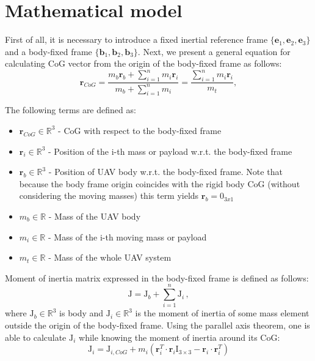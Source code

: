 \section{Mathematical model}

First of all, it is necessary to introduce a fixed inertial reference frame $\{  \textbf{e}_1,  \textbf{e}_2,  \textbf{e}_3  \}$ and a body-fixed frame $ \{  \textbf{b}_1,  \textbf{b}_2,  \textbf{b}_3 \}$. Next, we present
a general equation for calculating CoG vector from the origin of the body-fixed frame as follows: 
\begin{equation}
	\textbf{r}_{CoG} = \frac{m_{b}\textbf{r}_{b} + \sum_{i=1}^n m_{i} \textbf{r}_{i}}{m_{b} + \sum_{i=1}^n m_{i}} = \frac{\sum_{i=1}^n m_{i}\textbf{r}_{i}}{m_t},
	\label{equ:cog}
\end{equation}

The following terms are defined as: 
\begin{itemize}
	\item $ \textbf{r}_{CoG} \in \mathbb{\text{R}}^3$ - CoG with respect to the body-fixed frame
	
	\item $ \textbf{r}_{i} \in \mathbb{\text{R}}^3$ - Position of the i-th mass or payload w.r.t. the body-fixed frame
	
	\item $ \textbf{r}_{b} \in \mathbb{\text{R}}^3$ - Position of UAV body w.r.t. the body-fixed frame. Note that because the body frame origin coincides with the rigid body CoG (without considering the moving masses) this term yields $ \textbf{r}_b = 0_{3x1}$
	
	\item $m_b \in \mathbb{R}$ - Mass of the UAV body 
	
	\item $m_i \in \mathbb{R}$ - Mass of the i-th moving mass or payload
	
	\item $m_t \in \mathbb{R}$ - Mass of the whole UAV system
\end{itemize}

Moment of inertia matrix expressed in the body-fixed frame is defined as follows:
\begin{equation}
\text{J} = \text{J}_b + \sum_{i=1}^{n}\text{J}_i \, ,
\end{equation}
where $\text{J}_b \in \mathbb{R}^3$ is body and $\text{J}_i \in \mathbb{R}^3$ is the moment of inertia of some mass element outside the origin of the body-fixed frame. Using the parallel axis theorem, one is able to calculate $\text{J}_i$ while knowing the moment of inertia around its CoG:
\begin{equation}
\text{J}_i = \text{J}_{i,CoG} + m_i( \textbf{r}_i^T \cdot  \textbf{r}_i \text{I}_{3 \times 3} -  \textbf{r}_i \cdot  \textbf{r}_i^T)
\end{equation}

